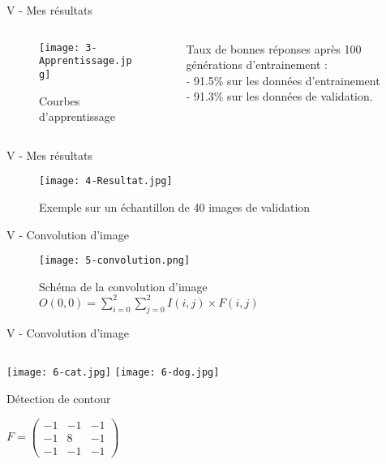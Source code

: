 \begin{frame}{V - Mes résultats}
	\begin{columns}[T] %
		\begin{column}{.52\textwidth}
			\begin{figure}
				\centering
				\texttt{[image: 3-Apprentissage.jpg]}
				\caption{Courbes d'apprentissage}
			\end{figure}
		\end{column}
		\hfill
		\begin{column}{.50\textwidth}
			\bigskip	\bigskip	\bigskip
			\bigskip	\bigskip	\bigskip
			\bigskip	\bigskip	\bigskip
			Taux de bonnes réponses après 100 générations d'entrainement : \\
			- 91.5\% sur les données d'entrainement \\
			- 91.3\% sur les données de validation. \\
		\end{column}%
	\end{columns}
\end{frame}


\begin{frame}{V - Mes résultats}
	\begin{figure}
		\centering
		\texttt{[image: 4-Resultat.jpg]}
		\caption{Exemple sur un échantillon de 40 images de validation}
	\end{figure}
\end{frame}


\begin{frame}{V - Convolution d'image}
	\begin{figure}
		\centering
		\texttt{[image: 5-convolution.png]}
		\caption{Schéma de la convolution d'image $O(0, 0) = \sum_{i=0}^{2}\sum_{j=0}^{2}I(i, j)\times F(i, j)$}
	\end{figure}
\end{frame}


\begin{frame}{V - Convolution d'image}
	\begin{columns}[T] %
		\begin{column}{.4\textwidth}
			\texttt{[image: 6-cat.jpg]}
			\texttt{[image: 6-dog.jpg]}
			\begin{exampleblock}{Détection de contour}
				\begin{center}
					\centering
					$
					F =
					\begin{pmatrix}
						-1 & -1 & -1 \\
						-1 & 8  & -1 \\
						-1 & -1 & -1
					\end{pmatrix}
					$
				\end{center}
			\end{exampleblock}
		\end{column}
		\hfill
		\begin{column}{.58\textwidth}
			
		\end{column}
	\end{columns}
\end{frame}


